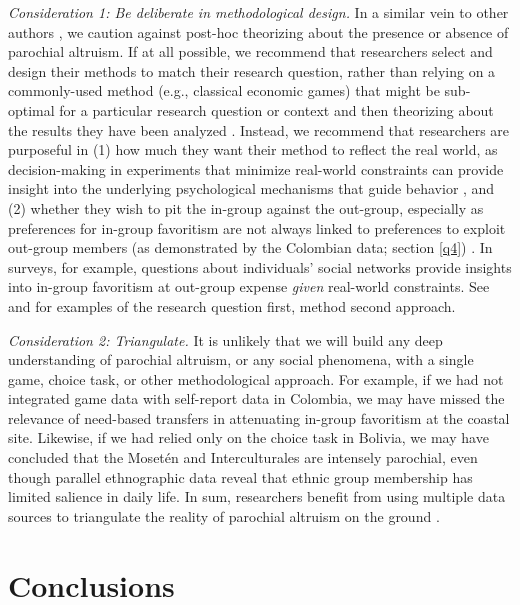 \documentclass[bibauthoryear]{aa}
\begin{document}
\emph{Consideration 1: Be deliberate in methodological design.} In a similar vein to other authors \citep[e.g.,][]{hagen2006game, guala2012reciprocity}, we caution against post-hoc theorizing about the presence or absence of parochial altruism. If at all possible, we recommend that researchers select and design their methods to match their research question, rather than relying on a commonly-used method (e.g., classical economic games) that might be sub-optimal for a particular research question or context and then theorizing about the results they have been analyzed \citep{Pisor2020}. Instead, we recommend that researchers are purposeful in (1) how much they want their method to reflect the real world, as decision-making in experiments that minimize real-world constraints can provide insight into the underlying psychological mechanisms that guide behavior \citep{Pisor2020}, and (2) whether they wish to pit the in-group against the out-group, especially as preferences for in-group favoritism are not always linked to preferences to exploit out-group members (as demonstrated by the Colombian data; section \ref{q4}) \citep{brewer2006evolutionary, cashdan2001ethnocentrism, hruschka2013economic, purzycki2019identity, schaub2017threat, yamagishi2013behavioral}. In surveys, for example, questions about individuals' social networks provide insights into in-group favoritism at out-group expense \emph{given} real-world constraints. See \citet{schaub2017threat} and \citet{yamagishi2016parochial} for examples of the research question first, method second approach.

\emph{Consideration 2: Triangulate.} It is unlikely that we will build any deep understanding of parochial altruism, or any social phenomena, with a single game, choice task, or other methodological approach. For example, if we had not integrated game data with self-report data in Colombia, we may have missed the relevance of need-based transfers in attenuating in-group favoritism at the coastal site. Likewise, if we had relied only on the choice task in Bolivia, we may have concluded that the Moset\'en and Interculturales are intensely parochial, even though parallel ethnographic data reveal that ethnic group membership has limited salience in daily life. In sum, researchers benefit from using multiple data sources to triangulate the reality of parochial altruism on the ground \citep{Friedman2004, Pisor2020, Naar2020, gurven2008collective}.

\section{Conclusions}
 
\end{document}
